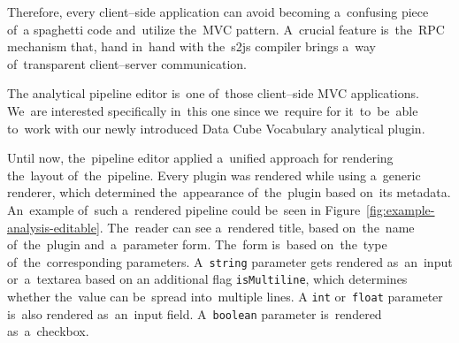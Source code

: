 Therefore, every client--side application can avoid becoming a~confusing piece of~a
spaghetti code and~utilize the~MVC pattern. A~crucial feature is~the~RPC 
mechanism that, hand in~hand with the~s2js compiler brings a~way of~transparent 
client--server communication.

The analytical pipeline editor is~one of~those client--side MVC applications. We~are interested specifically in~this one since we~require for it~to~be~able to~work 
with our newly introduced Data Cube Vocabulary analytical plugin.

Until now, the~pipeline editor applied a~unified approach for rendering the~layout of~the~pipeline. Every plugin was rendered while using a~generic 
renderer, which determined the~appearance of~the~plugin based on~its metadata. An~example of~such a~rendered pipeline could be~seen in
Figure~\ref{fig:example-analysis-editable}. The~reader can see a~rendered title, based on~the~name of~the~plugin and~a~parameter form. The~form is~based on~the~type of~the~corresponding parameters. A~\texttt{string} parameter gets rendered as~an~input or~a~textarea based on
an additional flag \texttt{isMultiline}, which determines whether the~value can be~spread into~multiple lines.
A \texttt{int} or~\texttt{float} parameter is~also rendered as~an~input field. A~\texttt{boolean} parameter 
is~rendered as~a~checkbox.

